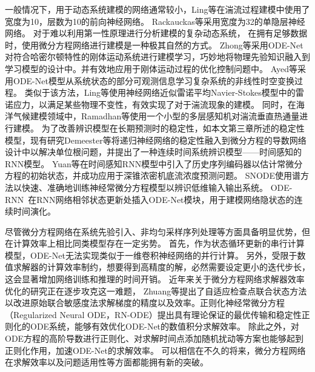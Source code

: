 一般情况下，用于动态系统建模的网络通常较小，Ling等\cite{ling2016reynolds}在湍流过程建模中使用了宽度为10，层数为10的前向神经网络。
Rackauckas等\cite{rackauckas2020universal}采用宽度为32的单隐层神经网络。
对于难以利用第一性原理进行分析建模的复杂动态系统，
在拥有足够数据时，使用微分方程网络进行建模是一种极其自然的方式。
Zhong等\cite{zhong2019symplectic}采用ODE-Net对符合哈密尔顿特性的刚体运动系统进行建模学习，巧妙地将物理先验知识融入到学习模型的设计中。并有效地应用于刚体运动过程的优化控制问题中。
Ayed等\cite{ayed2019learning}采用ODE-Net模型从系统状态的部分可观测信息学习复杂系统的非线性时空变换过程。
类似于该方法，Ling等\cite{ling2016reynolds}使用神经网络近似雷诺平均Navier-Stokes模型中的雷诺应力，以满足某些物理不变性，有效实现了对于湍流现象的建模。
同时，在海洋气候建模领域中，Ramadhan等\cite{ramadhan2020capturing}使用一个小型的多层感知机对湍流垂直热通量进行建模。
为了改善辨识模型在长期预测时的稳定性，如本文第三章所述的稳定性模型，现有研究Demeester等\cite{Demeester2019}将递归神经网络的稳定性融入到微分方程的导数网络设计中以解决单位根问题，并提出了一种连续时间系统辨识模型——时间感知的RNN模型。
Yuan等\cite{Yuan2022}在时间感知RNN模型中引入了历史序列编码器以估计常微分方程的初始状态，并成功应用于深锥浓密机底流浓度预测问题。
SNODE\cite{Quaglino2019}使用谱方法以快速、准确地训练神经常微分方程模型以辨识低维输入输出系统。
ODE-RNN~\cite{Rubanova2019}在RNN网络相邻状态更新处插入ODE-Net模块，用于建模网络隐状态的连续时间演化。


尽管微分方程网络在系统先验引入、非均匀采样序列处理等方面具备明显优势，但在计算效率上相比同类模型存在一定劣势。
首先，作为状态循环更新的串行计算模型，ODE-Net无法实现类似于一维卷积神经网络的并行计算。
另外，受限于数值求解器的计算效率制约，想要得到高精度的解，必然需要设定更小的迭代步长，这会显著增加网络训练和推理的时间开销。
近年来关于微分方程网络求解器效率优化的研究正在逐步攻克这一难题，
Zhuang等\cite{Zhuang2020}提出了自适应检查点联合状态方法以改进原始联合敏感度法求解梯度的精度以及效率。正则化神经常微分方程（Regularized Neural ODE，RN-ODE）\cite{J2020}提出具有理论保证的最优传输和稳定性正则化的ODE系统，能够有效优化ODE-Net的数值积分求解效率。
除此之外，对ODE方程的高阶导数进行正则化\cite{kelly2020}、对求解时间点添加随机扰动\cite{Ghosh2020}等方案也能够起到正则化作用，加速ODE-Net的求解效率。
可以相信在不久的将来，微分方程网络在求解效率以及问题适用性等方面都能拥有新的突破。


